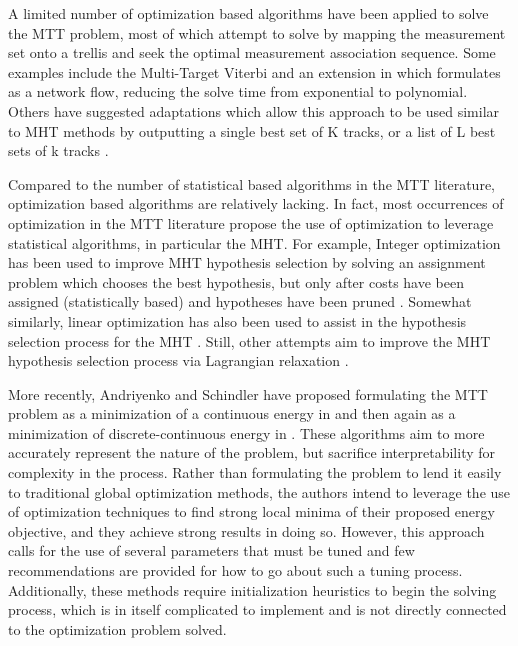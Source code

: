 \documentclass[journal]{IEEEtran}
\begin{document}
A limited number of optimization based algorithms have been applied to solve the MTT problem, most of which attempt to solve by mapping the measurement set onto a trellis and seek the optimal measurement association sequence. Some examples include the Multi-Target Viterbi\cite{Viterbi-1} and an extension in \cite{Viterbi-2} which formulates \cite{Viterbi-1} as a network flow, reducing the solve time from exponential to polynomial. Others have suggested adaptations which allow this approach to be used similar to MHT methods by outputting a single best set of K tracks, or a list of L best sets of k tracks \cite{Viterbi-3}. 

Compared to the number of statistical based algorithms in the MTT literature, optimization based algorithms are relatively lacking. In fact, most occurrences of optimization in the MTT literature propose the use of optimization to leverage statistical algorithms, in particular the MHT. For example, Integer optimization has been used to improve MHT hypothesis selection by solving an assignment problem which chooses the best hypothesis, but only after costs have been assigned (statistically based) and hypotheses have been pruned \cite{MHT-IP}. Somewhat similarly, linear optimization has also been used to assist in the hypothesis selection process for the MHT \cite{MHT-LP}. Still, other attempts aim to improve the MHT hypothesis selection process via Lagrangian relaxation \cite{Lagrangian}. 

More recently, Andriyenko and Schindler have proposed formulating the MTT problem as a minimization of a continuous energy in \cite{Continuous_energy} and then again as a minimization of discrete-continuous energy in \cite{Discrete-Continuous_energy}. These algorithms aim to more accurately represent the nature of the problem, but sacrifice interpretability for complexity in the process. Rather than formulating the problem to lend it easily to traditional global optimization methods, the authors intend to leverage the use of optimization techniques to find strong local minima of their proposed energy objective, and they achieve strong results in doing so. However, this approach calls for the use of several parameters that must be tuned and few recommendations are provided for how to go about such a tuning process. Additionally, these methods require initialization heuristics to begin the solving process, which is in itself complicated to implement and is not directly connected to the optimization problem solved. 
\end{document}
